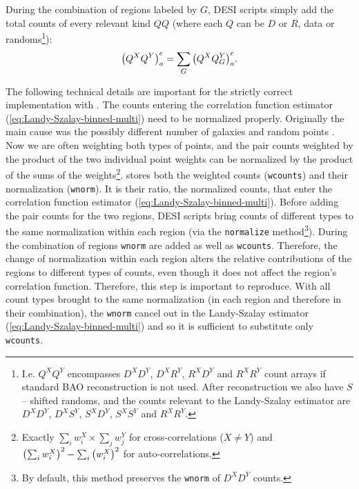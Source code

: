 During the combination of regions labeled by $G$, DESI scripts simply add the total counts of every relevant kind $QQ$ (where each $Q$ can be $D$ or $R$, data or randoms\footnote{I.e. $Q^XQ^Y$ encompasses $D^XD^Y$, $D^XR^Y$, $R^XD^Y$ and $R^XR^Y$ count arrays if standard BAO reconstruction is not used. After reconstruction we also have $S$ -- shifted randoms, and the counts relevant to the Landy-Szalay estimator are $D^XD^Y$, $D^XS^Y$, $S^XD^Y$, $S^XS^Y$ and $R^XR^Y$.}):
\begin{equation}
    \qty(Q^XQ^Y)_a^c = \sum_G \qty(Q^XQ^Y_G)_a^c.
\end{equation}

The following technical details are important for the strictly correct implementation with \pycorr{}.
The counts entering the correlation function estimator (\cref{eq:Landy-Szalay-binned-multi}) need to be normalized properly.
Originally the main cause was the possibly different number of galaxies and random points \citep{Landy-Szalay,2PCF-estimators-comparison}.
Now we are often weighting both types of points, and the pair counts weighted by the product of the two individual point weights can be normalized by the product of the sums of the weights\footnote{Exactly $\sum_i w_i^X \times \sum_j w_j^Y$ for cross-correlations ($X\ne Y$) and $\qty(\sum_i w_i^X)^2 - \sum_i \qty( w_i^X)^2$ for auto-correlations.}.
\pycorr{} stores both the weighted counts ({\tt wcounts}) and their normalization ({\tt wnorm}).
It is their ratio, the normalized counts, that enter the correlation function estimator (\cref{eq:Landy-Szalay-binned-multi}).
Before adding the pair counts for the two regions, DESI scripts bring counts of different types to the same normalization within each region (via the {\tt normalize} method\footnote{By default, this method preserves the {\tt wnorm} of $D^XD^Y$ counts.}).
During the combination of regions {\tt wnorm} are added as well as {\tt wcounts}.
Therefore, the change of normalization within each region alters the relative contributions of the regions to different types of counts, even though it does not affect the region's correlation function.
Therefore, this step is important to reproduce.
With all count types brought to the same normalization (in each region and therefore in their combination), the {\tt wnorm} cancel out in the Landy-Szalay estimator (\cref{eq:Landy-Szalay-binned-multi}) and so it is sufficient to substitute only {\tt wcounts}.

